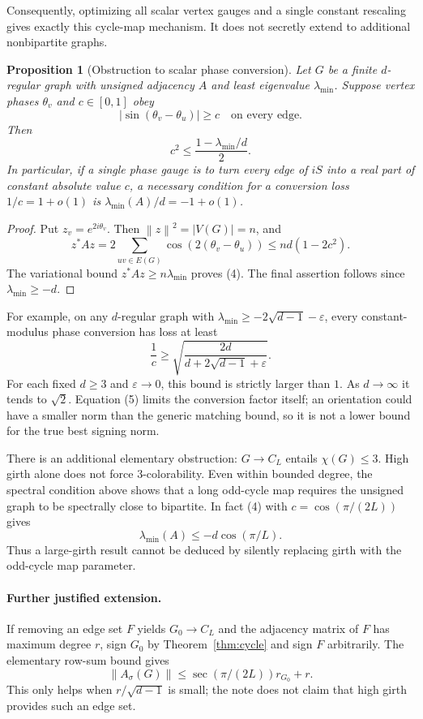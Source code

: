 \documentclass[11pt]{article}
\newtheorem{proposition}{Proposition}
\newcommand{\norm}[1]{\left\lVert #1\right\rVert}
\begin{document}
Consequently, optimizing all scalar vertex gauges and a single constant
rescaling gives exactly this cycle-map mechanism. It does not secretly
extend to additional nonbipartite graphs.

\begin{proposition}[Obstruction to scalar phase conversion]\label{prop:obstruction}
Let $G$ be a finite $d$-regular graph with unsigned adjacency $A$ and
least eigenvalue $\lambda_{\min}$. Suppose vertex phases $\theta_v$ and
$c\in[0,1]$ obey
\[
 |\sin(\theta_v-\theta_u)|\ge c\quad\text{on every edge.}
 \tag{3}
\]
Then
\[
 c^2\le \frac{1-\lambda_{\min}/d}{2}.
 \tag{4}
\]
In particular, if a single phase gauge is to turn every edge of $iS$
into a real part of constant absolute value $c$, a necessary condition
for a conversion loss $1/c=1+o(1)$ is
$\lambda_{\min}(A)/d=-1+o(1)$.
\end{proposition}
\begin{proof}
Put $z_v=e^{2i\theta_v}$. Then $\norm z^2=|V(G)|=n$, and
\[
 z^*Az=2\sum_{uv\in E(G)}\cos(2(\theta_v-\theta_u))
 \le nd(1-2c^2).
\]
The variational bound $z^*Az\ge n\lambda_{\min}$ proves (4).
The final assertion follows since $\lambda_{\min}\ge-d$.
\end{proof}

For example, on any $d$-regular graph with
$\lambda_{\min}\ge-2\sqrt{d-1}-\varepsilon$, every constant-modulus
phase conversion has loss at least
\[
 \frac1c\ge
 \sqrt{\frac{2d}{d+2\sqrt{d-1}+\varepsilon}}.
 \tag{5}
\]
For each fixed $d\ge3$ and $\varepsilon\to0$, this bound is strictly
larger than $1$. As $d\to\infty$ it tends to $\sqrt2$.
Equation (5) limits the conversion factor itself; an orientation could
have a smaller norm than the generic matching bound, so it is not a
lower bound for the true best signing norm.

There is an additional elementary obstruction: $G\to C_L$ entails
$\chi(G)\le3$. High girth alone does not force $3$-colorability. Even
within bounded degree, the spectral condition above shows that a long
odd-cycle map requires the unsigned graph to be spectrally close to
bipartite. In fact (4) with $c=\cos(\pi/(2L))$ gives
\[
 \lambda_{\min}(A)\le-d\cos(\pi/L).
 \tag{6}
\]
Thus a large-girth result cannot be deduced by silently replacing
girth with the odd-cycle map parameter.

\paragraph{Further justified extension.}
If removing an edge set $F$ yields $G_0\to C_L$ and the adjacency matrix
of $F$ has maximum degree $r$, sign $G_0$ by Theorem~\ref{thm:cycle}
and sign $F$ arbitrarily. The elementary row-sum bound gives
\[
 \norm{A_\sigma(G)}\le\sec(\pi/(2L))r_{G_0}+r.
\]
This only helps when $r/\sqrt{d-1}$ is small; the note does not claim
that high girth provides such an edge set.
\end{document}

